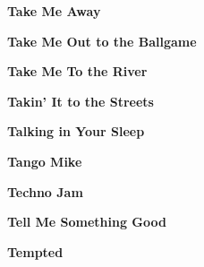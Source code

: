 \newline
\vspace{10pt} 
\begin{center}\textbf{Take Me Away}\end{center}
\newline
\vspace{10pt} 
\begin{center}\textbf{Take Me Out to the Ballgame}\end{center}
\newline
\vspace{10pt} 
\begin{center}\textbf{Take Me To the River}\end{center}
\newline
\vspace{10pt} 
\begin{center}\textbf{Takin' It to the Streets}\end{center}
\newline
\vspace{10pt} 
\begin{center}\textbf{Talking in Your Sleep}\end{center}
\newline
\vspace{10pt} 
\begin{center}\textbf{Tango Mike}\end{center}
\newline
\vspace{10pt} 
\begin{center}\textbf{Techno Jam}\end{center}
\newline
\vspace{10pt} 
\begin{center}\textbf{Tell Me Something Good}\end{center}
\newline
\vspace{10pt} 
\begin{center}\textbf{Tempted}\end{center}
\newline
